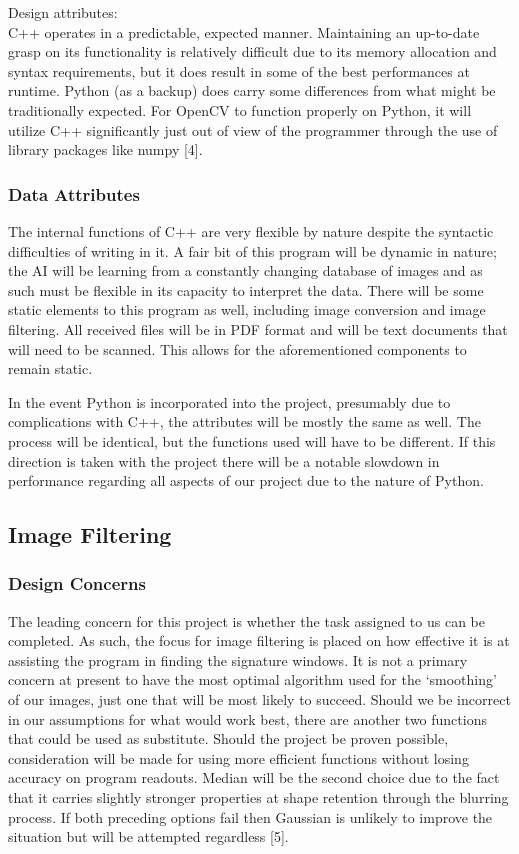 \documentclass[onecolumn, draftclsnofoot,10pt, compsoc]{IEEEtran}
\begin{document}
		Design attributes:\\
C++ operates in a predictable, expected manner. Maintaining an up-to-date grasp on its functionality is relatively difficult due to its memory allocation and syntax requirements, but it does result in some of the best performances at runtime. Python (as a backup) does carry some differences from what might be traditionally expected. For OpenCV to function properly on Python, it will utilize C++ significantly just out of view of the programmer through the use of library packages like numpy [4]. 


\subsubsection{Data Attributes}
The internal functions of C++ are very flexible by nature despite the syntactic difficulties of writing in it. A fair bit of this program will be dynamic in nature; the AI will be learning from a constantly changing database of images and as such must be flexible in its capacity to interpret the data. There will be some static elements to this program as well, including image conversion and image filtering. All received files will be in PDF format and will be text documents that will need to be scanned. This allows for the aforementioned components to remain static. 

In the event Python is incorporated into the project, presumably due to complications with C++, the attributes will be mostly the same as well. The process will be identical, but the functions used will have to be different. If this direction is taken with the project there will be a notable slowdown in performance regarding all aspects of our project due to the nature of Python.

\subsection{Image Filtering}
\subsubsection{Design Concerns}
The leading concern for this project is whether the task assigned to us can be completed. As such, the focus for image filtering is placed on how effective it is at assisting the program in finding the signature windows. It is not a primary concern at present to have the most optimal algorithm used for the ‘smoothing’ of our images, just one that will be most likely to succeed. Should we be incorrect in our assumptions for what would work best, there are another two functions that could be used as substitute. Should the project be proven possible, consideration will be made for using more efficient functions without losing accuracy on program readouts. Median will be the second choice due to the fact that it carries slightly stronger properties at shape retention through the blurring process. If both preceding options fail then Gaussian is unlikely to improve the situation but will be attempted regardless [5].
\end{document}
